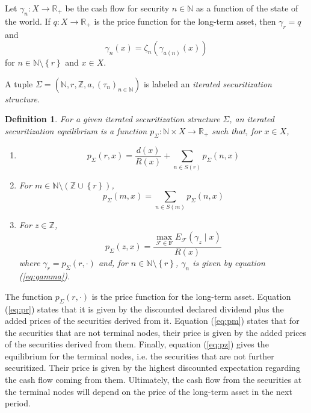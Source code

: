 \documentclass[11pt]{article}
\theoremstyle{plain}
\newtheorem{dfn}{Definition}%
\begin{document}
Let $\gamma_n:X\to\mathbb{R}_+$ be the cash flow for security $n\in\mathbb{N}$ as a function of the state of the world. If $q:X\to\mathbb{R}_+$ is the price function for the long-term asset, then $\gamma_r=q$  and
\begin{equation} \label{eq:gamma}
\gamma_{n}(x) = \zeta_n(\gamma_{a(n)}(x))
\end{equation}
for $n\in\mathbb{N}\setminus\left\{r\right\}$ and $x\in X$.

A tuple $\Sigma=\left(\mathbb{N},r,\mathbb{Z},a,(\tau_n)_{n\in\mathbb{N}}\right)$ is labeled an \textit{iterated securitization structure}.

\begin{dfn} \label{def:ise}
For a given iterated securitization structure $\Sigma$, an iterated securitization equilibrium is a function $p_{\Sigma}:\mathbb{N}\times X \to \mathbb{R}_+$ such that, for $x\in X$,
\begin{enumerate}
\item
\begin{equation} \label{eq:pr}
p_{\Sigma}(r,x) = \frac{d(x)}{R(x)}+\sum_{n\in S(r)}p_{\Sigma}(n,x)
\end{equation}
\item For $m\in\mathbb{N}\setminus(\mathbb{Z}\cup\left\{r\right\})$,
\begin{equation} \label{eq:pm}
p_{\Sigma}(m,x) = \sum_{n\in S(m)}p_{\Sigma}(n,x)
\end{equation}
\item For $z\in\mathbb{Z}$,
\begin{equation} \label{eq:pz}
p_{\Sigma}(z,x) = \frac{\max_{\mathcal{F}\in\mathbf{F}}E_{\mathcal{F}}\left(\gamma_z\mid x\right)}{R(x)}
\end{equation}
where $\gamma_r=p_{\Sigma}(r,\cdot)$ and, for $n\in\mathbb{N}\setminus\left\{r\right\}$, $\gamma_n$ is given by equation (\ref{eq:gamma}).
\end{enumerate}
\end{dfn}

The function $p_{\Sigma}(r,\cdot)$ is the price function for the long-term asset. Equation (\ref{eq:pr}) states that it is given by the discounted declared dividend plus the added prices of the securities derived from it. Equation (\ref{eq:pm}) states that for the securities that are not terminal nodes, their price is given by the added prices of the securities derived from them. Finally, equation (\ref{eq:pz}) gives the equilibrium for the terminal nodes, i.e. the securities that are not further securitized. Their price is given by the highest discounted expectation regarding the cash flow coming from them. Ultimately, the cash flow from the securities at the terminal nodes will depend on the price of the long-term asset in the next period.
\end{document}
